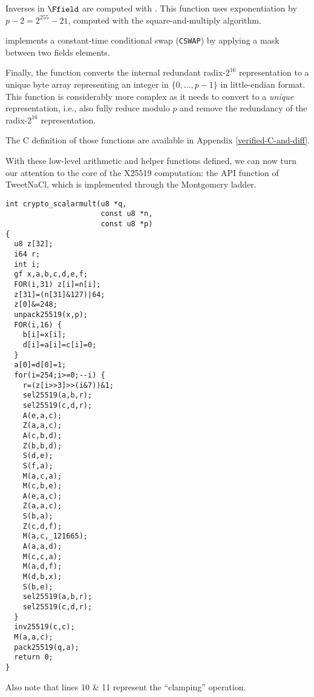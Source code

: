 Inverses in $\Ffield$ are computed with .
This function uses exponentiation by $p - 2 = 2^{255}-21$,
computed with the square-and-multiply algorithm.

 implements a constant-time conditional swap (\texttt{CSWAP}) by
applying a mask between two fields elements.

Finally, the  function
converts the internal redundant radix-$2^{16}$
representation to a unique byte array representing an
integer in $\{0,\dots,p-1\}$ in little-endian format.
This function is considerably more complex as it needs to convert
to a \emph{unique} representation, i.e., also fully reduce modulo
$p$ and remove the redundancy of the radix-$2^{16}$ representation.

The C definition of those functions are available in
Appendix \ref{verified-C-and-diff}.

With these low-level arithmetic and helper functions defined,
we can now turn our attention to the core of the X25519 computation:
the  API function of TweetNaCl,
which is implemented through the Montgomery ladder.

\begin{lstlisting}[language=Ctweetnacl]
int crypto_scalarmult(u8 *q,
                      const u8 *n,
                      const u8 *p)
{
  u8 z[32];
  i64 r;
  int i;
  gf x,a,b,c,d,e,f;
  FOR(i,31) z[i]=n[i];
  z[31]=(n[31]&127)|64;
  z[0]&=248;
  unpack25519(x,p);
  FOR(i,16) {
    b[i]=x[i];
    d[i]=a[i]=c[i]=0;
  }
  a[0]=d[0]=1;
  for(i=254;i>=0;--i) {
    r=(z[i>>3]>>(i&7))&1;
    sel25519(a,b,r);
    sel25519(c,d,r);
    A(e,a,c);
    Z(a,a,c);
    A(c,b,d);
    Z(b,b,d);
    S(d,e);
    S(f,a);
    M(a,c,a);
    M(c,b,e);
    A(e,a,c);
    Z(a,a,c);
    S(b,a);
    Z(c,d,f);
    M(a,c,_121665);
    A(a,a,d);
    M(c,c,a);
    M(a,d,f);
    M(d,b,x);
    S(b,e);
    sel25519(a,b,r);
    sel25519(c,d,r);
  }
  inv25519(c,c);
  M(a,a,c);
  pack25519(q,a);
  return 0;
}
\end{lstlisting}

Also note that lines 10 \& 11 represent the ``clamping'' operation.
